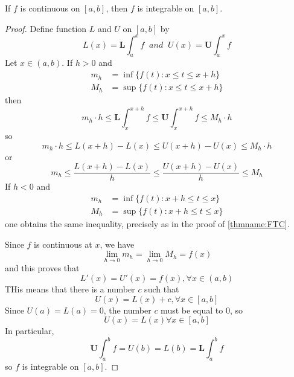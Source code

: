 \documentclass[12pt, a4paper, oneside, openright, titlepage]{book}
\begin{document}
\begin{thm}
    If $f$ is continuous on $[a,b]$, then $f$ is integrable on $[a,b]$.
\end{thm}
\begin{proof}
    Define function $L$ and $U$ on $[a,b]$ by \begin{equation*}
        L(x) = \mathbf{L}\int_a^xf\;\;and\;\;U(x) = \mathbf{U}\int_a^xf
    \end{equation*}
    Let $x \in (a,b)$. If $h > 0$ and \begin{align*}
        m_h &= \inf\{f(t):x\leq t \leq x+h\} \\
        M_h &= \sup\{f(t): x\leq t\leq x+h\} 
    \end{align*}
    then \begin{equation*}
        m_h\cdot h \leq \mathbf{L}\int_x^{x+h}f \leq \mathbf{U}\int_x^{x+h}f\leq M_h\cdot h
    \end{equation*}
    so \begin{equation*}
        m_h\cdot h \leq L(x+h) - L(x) \leq U(x+h) - U(x) \leq M_h\cdot h
    \end{equation*}
    or \begin{equation*}
        m_h\leq \frac{L(x+h)-L(x)}{h} \leq \frac{U(x+h)-U(x)}{h} \leq M_h
    \end{equation*}
    If $h < 0$ and \begin{align*}
        m_h &= \inf\{f(t):x+h\leq t \leq x\} \\
        M_h &= \sup\{f(t): x+h\leq t\leq x\} 
    \end{align*}
    one obtains the same inequality, precisely as in the proof of \ref{thmname:FTC}.

    Since $f$ is continuous at $x$, we have \begin{equation*}
        \lim\limits_{h\rightarrow 0}m_h = \lim\limits_{h\rightarrow 0}M_h = f(x)
    \end{equation*}
    and this proves that \begin{equation*}
        L'(x) = U'(x) = f(x),\forall x\in(a,b)
    \end{equation*}
    THis means that there is a number $c$ such that \begin{equation*}
        U(x) = L(x) + c,\forall x \in [a,b]
    \end{equation*}
    Since $U(a) = L(a) = 0$, the number $c$ must be equal to $0$, so \begin{equation*}
        U(x) = L(x) \forall x \in [a,b]
    \end{equation*}
    In particular, \begin{equation*}
        \mathbf{U}\int_a^bf = U(b) = L(b) = \mathbf{L}\int_a^bf
    \end{equation*}
    so $f$ is integrable on $[a,b]$.
\end{proof}
\end{document}

